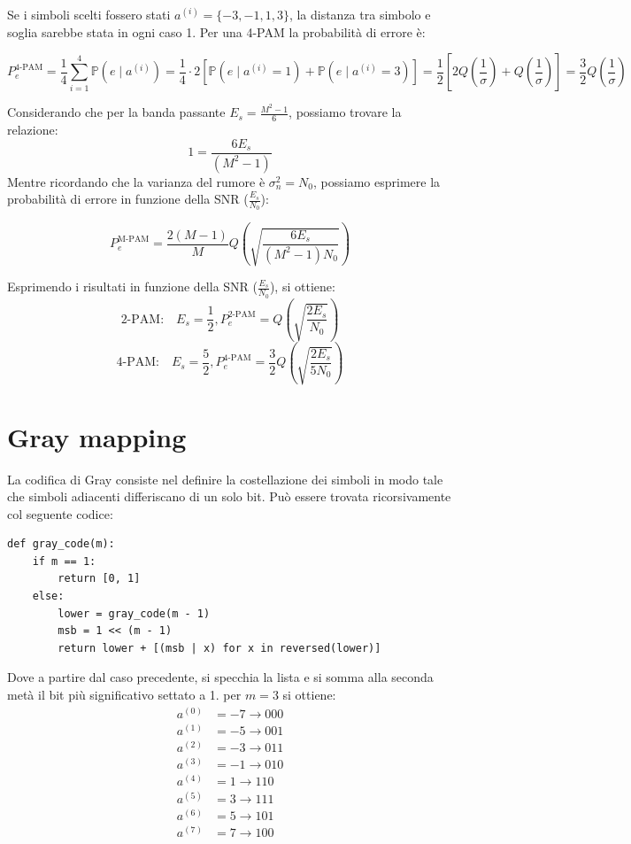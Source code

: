 Se i simboli scelti fossero stati $a^{(i)} = \{-3, -1, 1, 3\}$, la distanza tra simbolo e soglia sarebbe stata in ogni caso 1.
Per una 4-PAM la probabilità di errore è:

\[
    P^{\text{4-PAM}}_e = \frac{1}{4} \sum_{i=1}^{4} \mathbb{P}(e \mid a^{(i)}) = \frac{1}{4} \cdot 2 \left[ \mathbb{P}(e \mid a^{(i)} = 1) + \mathbb{P}(e \mid a^{(i)} = 3) \right] = \frac{1}{2} \left[ 2 Q\left( \frac{1}{\sigma} \right) + Q\left( \frac{1}{\sigma} \right) \right] = \frac{3}{2} Q\left( \frac{1}{\sigma} \right)
\]

Considerando che per la banda passante $E_s = \frac{M^2 - 1}{6}$, possiamo trovare la relazione:
\[
    1 = \frac{6 E_s}{(M^2 - 1)}
\]
Mentre ricordando che la varianza del rumore è $\sigma_n^2 = N_0$, possiamo esprimere la probabilità di errore in funzione della SNR ($\frac{E_s}{N_0}$):

\[
    P_e^{\text{M-PAM}} = \frac{2(M - 1)}{M} Q\left(\sqrt{\frac{6 E_s}{(M^2 - 1) N_0}}\right)
\]


Esprimendo i risultati in funzione della SNR ($\frac{E_s}{N_0}$), si ottiene:
\[
    \text{2-PAM:} \quad E_s = \frac{1}{2}, P^{\text{2-PAM}}_e = Q\left( \sqrt{\frac{2 E_s}{N_0}} \right)
\]
\[
    \text{4-PAM:} \quad E_s = \frac{5}{2}, P^{\text{4-PAM}}_e = \frac{3}{2} Q\left( \sqrt{\frac{2 E_s}{5 N_0}} \right)
\]




\section*{Gray mapping}
La codifica di Gray consiste nel definire la costellazione dei simboli in modo tale che simboli adiacenti differiscano di un solo bit.
Può essere trovata ricorsivamente col seguente codice:


\begin{verbatim}
def gray_code(m):
    if m == 1:
        return [0, 1] 
    else:
        lower = gray_code(m - 1)
        msb = 1 << (m - 1)
        return lower + [(msb | x) for x in reversed(lower)]
\end{verbatim}
Dove a partire dal caso precedente, si specchia la lista e si somma alla seconda metà il bit più significativo settato a 1.
per $m=3$ si ottiene:
\begin{align*}
    a^{(0)} & = -7 \rightarrow 000 \\
    a^{(1)} & = -5 \rightarrow 001 \\
    a^{(2)} & = -3 \rightarrow 011 \\
    a^{(3)} & = -1 \rightarrow 010 \\
    a^{(4)} & = 1 \rightarrow 110  \\
    a^{(5)} & = 3 \rightarrow 111  \\
    a^{(6)} & = 5 \rightarrow 101  \\
    a^{(7)} & = 7 \rightarrow 100
\end{align*}



